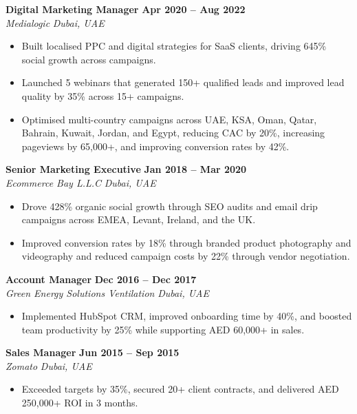 \documentclass[10pt,a4paper]{article}
\begin{document}
\noindent\textbf{Digital Marketing Manager} \hfill \textbf{Apr 2020 -- Aug 2022}\\
\textit{Medialogic} \hfill \textit{Dubai, UAE}
\begin{itemize}[leftmargin=*,nosep,topsep=2pt]
  \item Built localised PPC and digital strategies for SaaS clients, driving 645\% social growth across campaigns.
  \item Launched 5 webinars that generated 150+ qualified leads and improved lead quality by 35\% across 15+ campaigns.
  \item Optimised multi-country campaigns across UAE, KSA, Oman, Qatar, Bahrain, Kuwait, Jordan, and Egypt, reducing CAC by 20\%, increasing pageviews by 65,000+, and improving conversion rates by 42\%.
\end{itemize}
\vspace{3pt}

\noindent\textbf{Senior Marketing Executive} \hfill \textbf{Jan 2018 -- Mar 2020}\\
\textit{Ecommerce Bay L.L.C} \hfill \textit{Dubai, UAE}
\begin{itemize}[leftmargin=*,nosep,topsep=2pt]
  \item Drove 428\% organic social growth through SEO audits and email drip campaigns across EMEA, Levant, Ireland, and the UK.
  \item Improved conversion rates by 18\% through branded product photography and videography and reduced campaign costs by 22\% through vendor negotiation.
\end{itemize}
\vspace{3pt}

\noindent\textbf{Account Manager} \hfill \textbf{Dec 2016 -- Dec 2017}\\
\textit{Green Energy Solutions Ventilation} \hfill \textit{Dubai, UAE}
\begin{itemize}[leftmargin=*,nosep,topsep=2pt]
  \item Implemented HubSpot CRM, improved onboarding time by 40\%, and boosted team productivity by 25\% while supporting AED 60,000+ in sales.
\end{itemize}
\vspace{3pt}

\noindent\textbf{Sales Manager} \hfill \textbf{Jun 2015 -- Sep 2015}\\
\textit{Zomato} \hfill \textit{Dubai, UAE}
\begin{itemize}[leftmargin=*,nosep,topsep=2pt]
  \item Exceeded targets by 35\%, secured 20+ client contracts, and delivered AED 250,000+ ROI in 3 months.
\end{itemize}
\vspace{3pt}
\end{document}
